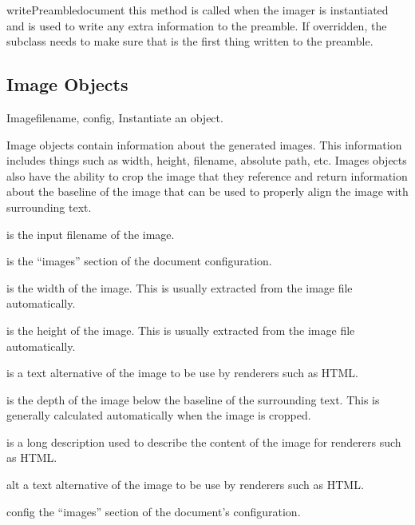 \begin{methoddesc}[Imager]{writePreamble}{document}
this method is called when the imager is instantiated and is used to 
write any extra information to the preamble.  If overridden, the
subclass needs to make sure that  is
the first thing written to the preamble.
\end{methoddesc}


\subsection{Image Objects}

\begin{classdesc}{Image}{filename, config, }
Instantiate an  object.

Image objects contain information about the generated images.  This 
information includes things such as width, height, filename, absolute
path, etc.  Images objects also have the ability to crop the image
that they reference and return information about the baseline of the 
image that can be used to properly align the image with surrounding
text.

 is the input filename of the image.

 is the ``images'' section of the document configuration.

 is the width of the image.  This is usually extracted from
the image file automatically.

 is the height of the image.  This is usually extracted
from the image file automatically.

 is a text alternative of the image to be use by renderers such
as HTML.

 is the depth of the image below the baseline of the 
surrounding text.  This is generally calculated automatically when
the image is cropped.

 is a long description used to describe the content of 
the image for renderers such as HTML.
\end{classdesc}

\begin{memberdesc}[Image]{alt}
a text alternative of the image to be use by renderers such as HTML.
\end{memberdesc}

\begin{memberdesc}[Image]{config}
the ``images'' section of the document's configuration.
\end{memberdesc}

